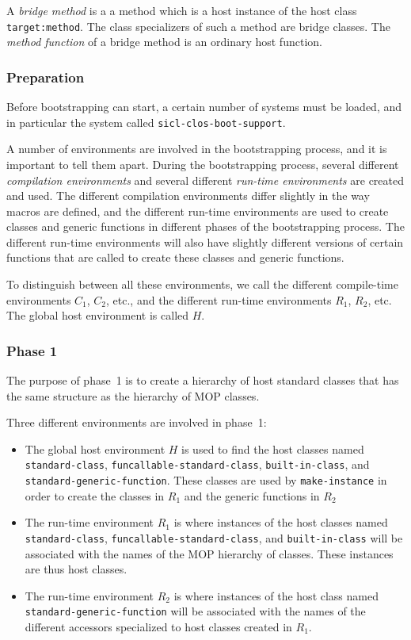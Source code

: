\begin{definition}
A \emph{bridge method} is a a method which is a host instance of the host
class \texttt{target:method}.  The class specializers of such a method are
bridge classes.  The \emph{method function} of a bridge method is an
ordinary host function.
\end{definition}

\subsubsection{Preparation}

Before bootstrapping can start, a certain number of \asdf{} systems
must be loaded, and in particular the system called
\texttt{sicl-clos-boot-support}.

A number of environments are involved in the bootstrapping process,
and it is important to tell them apart.  During the bootstrapping
process, several different \emph{compilation environments} and several
different \emph{run-time environments} are created and used.  The
different compilation environments differ slightly in the way macros
are defined, and the different run-time environments are used to
create classes and generic functions in different phases of the
bootstrapping process.  The different run-time environments will also
have slightly different versions of certain functions that are called
to create these classes and generic functions.

To distinguish between all these environments, we call the different
compile-time environments $C_1$, $C_2$, etc., and the different
run-time environments $R_1$, $R_2$, etc.  The global host environment
is called $H$.

\subsubsection{Phase 1}

The purpose of phase~1 is to create a hierarchy of host standard
classes that has the same structure as the hierarchy of MOP classes.

Three different environments are involved in phase~1:

\begin{itemize}
\item The global host environment $H$ is used to find the host classes
  named \texttt{standard-class}, \texttt{funcallable-standard-class},
  \texttt{built-in-class}, and \texttt{standard-generic-function}.
  These classes are used by \texttt{make-instance} in order to create
  the classes in $R_1$ and the generic functions in $R_2$
\item The run-time environment $R_1$ is where instances of the host
  classes named \texttt{standard-class},
  \texttt{funcallable-standard-class}, and \texttt{built-in-class}
  will be associated with the names of the MOP hierarchy of classes.
  These instances are thus host classes.
\item The run-time environment $R_2$ is where instances of the host
  class named \texttt{standard-generic-function} will be associated
  with the names of the different accessors specialized to host
  classes created in $R_1$.
\end{itemize}


